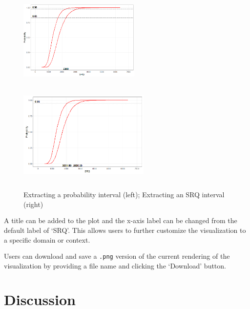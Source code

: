 \documentclass[11pt]{asaproc}\usepackage[]{graphicx}\usepackage[]{color}
\begin{document}
\begin{figure}[t]
\begin{center}
\includegraphics[height=5cm,width=6cm]{figures2/prob_int.png}
\includegraphics[height=5cm,width=6.5cm]{figures2/srq_int.png}
\end{center}
\caption{\label{ext_int}Extracting a probability interval (left); Extracting an SRQ interval (right)}
\end{figure}

A title can be added to the plot and the x-axis label can be changed from the default label of `SRQ'. This allows users to further customize the visualization to a specific domain or context. 

Users can download and save a {\tt .png} version of the current rendering of the visualization by providing a file name and clicking the `Download' button. 



\section{Discussion}
\label{Discussion}
\end{document}
